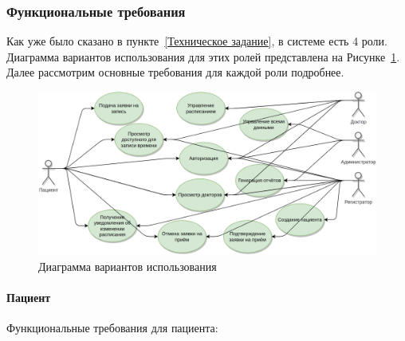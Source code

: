 \documentclass[a4paper,article]{article}
\begin{document}
\begin{sloppypar}
    \newpage

    \subsubsection{Функциональные требования}\label{ТЗ. Функциональные требования}

        Как уже было сказано в пункте~\ref{Техническое задание}, в системе есть 4 роли. Диаграмма вариантов использования для этих ролей представлена на Рисунке~\ref{fig:Диаграмма вариантов использования}. Далее рассмотрим основные требования для каждой роли подробнее.

        \begin{figure}[h]
            \centering
            \includegraphics[width=0.9\linewidth]{Диаграмма вариантов использования.png}
            \caption{\centering Диаграмма вариантов использования}
            \label{fig:Диаграмма вариантов использования}
        \end{figure}

    \paragraph{Пациент}\label{ТЗ. Пациент}

    Функциональные требования для пациента:


\end{sloppypar}
\end{document}
